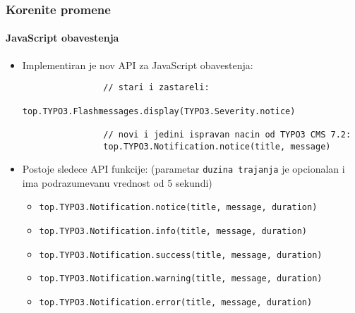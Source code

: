 \begin{frame}[fragile]
	\frametitle{Korenite promene}
	\framesubtitle{JavaScript obavestenja}

	\begin{itemize}

		\item Implementiran je nov API za JavaScript obavestenja:
			\begin{lstlisting}
				// stari i zastareli:
				top.TYPO3.Flashmessages.display(TYPO3.Severity.notice)

				// novi i jedini ispravan nacin od TYPO3 CMS 7.2:
				top.TYPO3.Notification.notice(title, message)
    		\end{lstlisting}

		\item Postoje sledece API funkcije:\newline
			\small(parametar \texttt{duzina trajanja} je opcionalan i ima podrazumevanu vrednost od 5 sekundi)\normalsize
			\begin{itemize}
				\item \normalsize\smaller\texttt{top.TYPO3.Notification.notice(title, message, duration)}\normalsize
				\item \smaller\texttt{top.TYPO3.Notification.info(title, message, duration)}\normalsize
				\item \smaller\texttt{top.TYPO3.Notification.success(title, message, duration)}\normalsize
				\item \smaller\texttt{top.TYPO3.Notification.warning(title, message, duration)}\normalsize
				\item \smaller\texttt{top.TYPO3.Notification.error(title, message, duration)}\normalsize
			\end{itemize}

	\end{itemize}

\end{frame}

